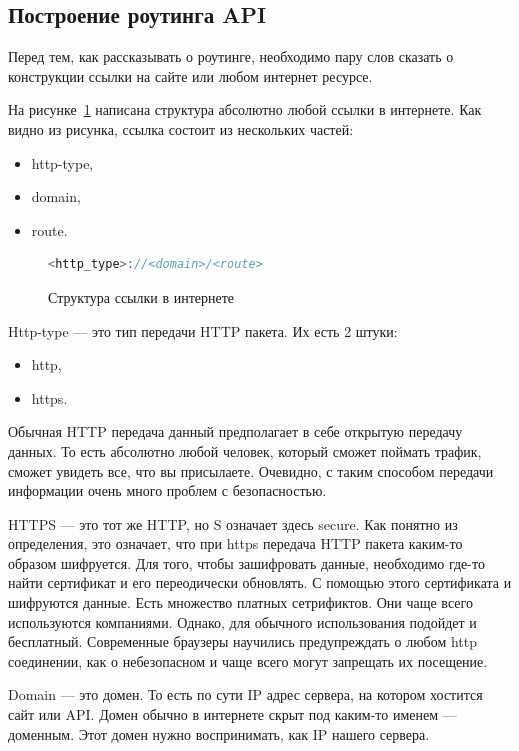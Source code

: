 \subsection{Построение роутинга API}
Перед тем, как рассказывать о роутинге, необходимо пару слов сказать о конструкции ссылки на сайте или любом интернет ресурсе.

На рисунке~\ref{url-struct} написана структура абсолютно любой ссылки в интернете.
Как видно из рисунка, ссылка состоит из нескольких частей:
\begin{itemize}
    \item http-type,
    \item domain,
    \item route.
\end{itemize}

\begin{figure}
    \begin{lstlisting}[language=go]
    <http_type>://<domain>/<route>
    \end{lstlisting}
    \caption{Структура ссылки в интернете}
    \label{url-struct}
\end{figure}

Http-type --- это тип передачи HTTP пакета. Их есть 2 штуки:
\begin{itemize}
    \item http,
    \item https.
\end{itemize}

Обычная HTTP передача данный предполагает в себе открытую передачу данных. 
То есть абсолютно любой человек, который сможет поймать трафик, сможет увидеть все, что вы присылаете.
Очевидно, с таким способом передачи информации очень много проблем с безопасностью.

HTTPS --- это тот же HTTP, но S означает здесь secure.
Как понятно из определения, это означает, что при https передача HTTP пакета каким-то образом шифруется.
Для того, чтобы зашифровать данные, необходимо где-то найти сертификат и его переодически обновлять.
С помощью этого сертификата и шифруются данные.
Есть множество платных сетрификтов. Они чаще всего используются компаниями.
Однако, для обычного использования подойдет и бесплатный.
Современные браузеры научились предупреждать о любом http соединении, как о небезопасном и чаще всего могут запрещать их посещение.

Domain --- это домен. То есть по сути IP адрес сервера, на котором хостится сайт или API. 
Домен обычно в интернете скрыт под каким-то именем --- доменным.
Этот домен нужно воспринимать, как IP нашего сервера.

